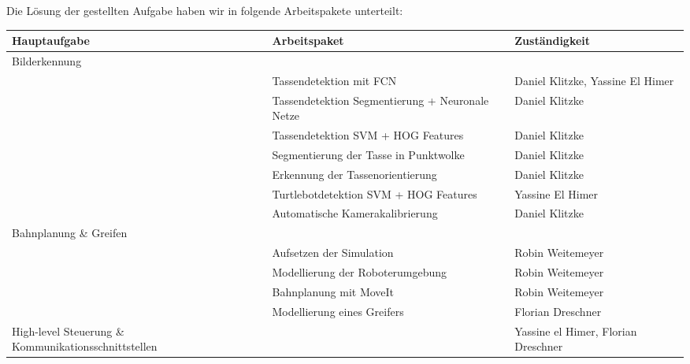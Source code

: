 Die Lösung der gestellten Aufgabe haben wir in folgende Arbeitspakete unterteilt:

\begin{tabular}{|p{5cm}|p{5cm}|p{5cm}|} \hline
Hauptaufgabe & Arbeitspaket & Zuständigkeit \\ \hline
Bilderkennung &  &  \\ \hline
 & Tassendetektion mit FCN & Daniel Klitzke, Yassine El Himer \\ \hline
 & Tassendetektion Segmentierung + Neuronale Netze & Daniel Klitzke \\ \hline
 & Tassendetektion SVM + HOG Features & Daniel Klitzke \\ \hline
 & Segmentierung der Tasse in Punktwolke & Daniel Klitzke \\ \hline
 & Erkennung der Tassenorientierung & Daniel Klitzke \\ \hline
 & Turtlebotdetektion SVM + HOG Features & Yassine El Himer \\ \hline
 & Automatische Kamerakalibrierung & Daniel Klitzke \\ \hline
 Bahnplanung \& Greifen & & \\ \hline
 & Aufsetzen der Simulation & Robin Weitemeyer \\ \hline
 & Modellierung der Roboterumgebung & Robin Weitemeyer \\ \hline
 & Bahnplanung mit MoveIt & Robin Weitemeyer \\ \hline
 & Modellierung eines Greifers & Florian Dreschner \\ \hline
 
 High-level Steuerung \& Kommunikationsschnittstellen & & Yassine el Himer, Florian Dreschner \\ \hline
 \end{tabular}